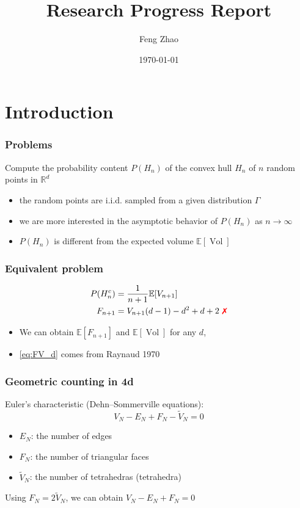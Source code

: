 \documentclass{beamer}
\title{Research Progress Report}
\author{Feng Zhao}
\date{\today}
\DeclareMathOperator{\Vol}{Vol}
\begin{document}
\begin{frame}
	\titlepage
\end{frame}


\section{Introduction}

\begin{frame}
\frametitle{Problems}
Compute the probability content $P(H_n)$ of the convex hull $H_n$
of $n$ random points in $\mathbb{R}^d$
\begin{itemize}
\item the random points are i.i.d. sampled from a given distribution $\Gamma$
\item we are more interested in the asymptotic behavior of $P(H_n)$
as $n\to\infty$
\item $P(H_n)$ is different from the expected volume $\mathbb{E}[\Vol]$
\end{itemize}
\end{frame}
\begin{frame}
	\frametitle{Equivalent problem}
    \begin{align}
        P(H_n^c) & = \frac{1}{n+1}\mathbb{E}[V_{n+1}]\\
        F_{n+1} & = V_{n+1} (d-1) - d^2 + d + 2 \textrm{ \textcolor{red}{\ding{55}}}
        \label{eq:FV_d}
    \end{align}   
    \begin{itemize}
    \item We can obtain
    $\mathbb{E}[F_{n+1}]$ and $\mathbb{E}[\Vol]$ for any $d$, 
    \item \eqref{eq:FV_d} comes from Raynaud 1970
    \end{itemize}
\end{frame}   


\begin{frame}
    \frametitle{Geometric counting in 4d}
    Euler's characteristic (Dehn–Sommerville equations):
    \begin{equation}
        V_N - E_N + F_N - \widetilde{V}_N = 0
    \end{equation}   
    \begin{itemize}
        \item $E_N$: the number of edges
        \item $F_N$: the number of triangular faces
        \item $\widetilde{V}_N$: the number of tetrahedras (tetrahedra)
    \end{itemize}    
    Using $F_N = 2 \widetilde{V}_N$,
    we can obtain $V_N - E_N + F_N = 0$
\end{frame}
\end{document}
